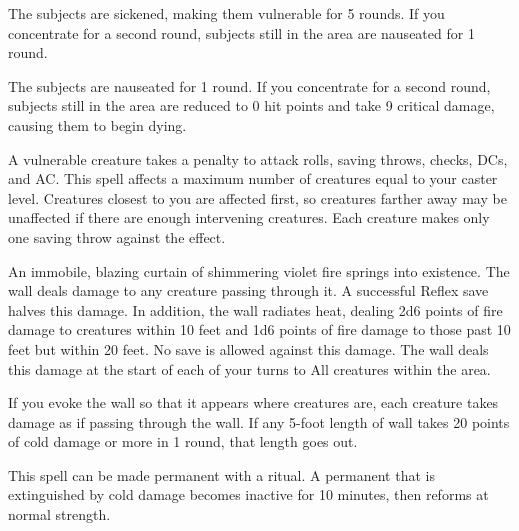 \begin{spellhealthy}
  The subjects are sickened, making them vulnerable for 5 rounds. If you concentrate for a second round, subjects still in the area are nauseated for 1 round.
\end{spellhealthy}
\begin{spellblood}
  The subjects are nauseated for 1 round. If you concentrate for a second round, subjects still in the area are reduced to 0 hit points and take 9 critical damage, causing them to begin dying.
\end{spellblood}
\begin{spellnotes}
  A vulnerable creature takes a  penalty to attack rolls, saving throws, checks, DCs, and AC.
  This spell affects a maximum number of creatures equal to your caster level. Creatures closest to you are affected first, so creatures farther away may be unaffected if there are enough intervening creatures. Each creature makes only one saving throw against the effect.
\end{spellnotes}

\spellrng{\rngmed}
\spelldur{\durshort}
\begin{spelleffect}
  An immobile, blazing curtain of shimmering violet fire springs into existence. The wall deals damage to any creature passing through it. A successful Reflex save halves this damage. In addition, the wall radiates heat, dealing 2d6 points of fire damage to creatures within 10 feet and 1d6 points of fire damage to those past 10 feet but within 20 feet. No save is allowed against this damage. The wall deals this damage at the start of each of your turns to All creatures within the area.
  \par If you evoke the wall so that it appears where creatures are, each creature takes damage as if passing through the wall. If any 5-foot length of wall takes 20 points of cold damage or more in 1 round, that length goes out.
\end{spelleffect}
\begin{spellnotes}
This spell can be made permanent with a  ritual. A permanent  that is extinguished by cold damage becomes inactive for 10 minutes, then reforms at normal strength.
\end{spellnotes}

